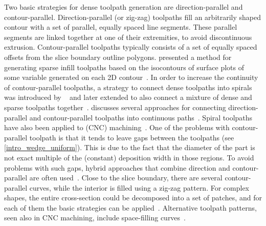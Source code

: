 Two basic strategies for dense toolpath generation are direction-parallel and contour-parallel.
Direction-parallel (or zig-zag) toolpaths fill an arbitrarily shaped contour with a set of parallel, equally spaced line segments.
These parallel segments are linked together at one of their extremities, to avoid discontinuous extrusion.
Contour-parallel toolpaths typically consists of a set of equally spaced offsets from the slice boundary outline polygons.
\citeauthor{steuben2016implicit} presented a method for generating sparse infill toolpaths based on the isocontours of surface plots of some variable generated on each 2D contour~\cite{steuben2016implicit}.
In order to increase the continuity of contour-parallel toolpaths, a strategy to connect dense toolpaths into spirals was introduced by \citeauthor{Zhao2016}~\cite{Zhao2016} and later extended to also connect a mixture of dense and sparse toolpaths together~\cite{KUIPERS2019CAD}.
\citeauthor{Jin2017RCIM} discusses several approaches for connecting direction-parallel and contour-parallel toolpaths into continuous paths~\cite{Jin2017RCIM}.
Spiral toolpaths have also been applied to (CNC) machining~\cite{Held2009,Huang2017}.
One of the problems with contour-parallel toolpath is that it tends to leave gaps between the toolpaths (see \cref{intro_wedge_uniform}).
This is due to the fact that the diameter of the part is not exact multiple of the (constant) deposition width in those regions.
To avoid problems with such gaps, hybrid approaches that combine direction and contour-parallel are often used~\cite{Mcmains2000DETC,Jin2013adaptive}.
Close to the slice boundary, there are several contour-parallel curves, while the interior is filled using a zig-zag pattern.
For complex shapes, the entire cross-section could be decomposed into a set of patches, and for each of them the basic strategies can be applied~\cite{Ding2014,Jin2017RCIM}.
Alternative toolpath patterns, seen also in CNC machining, include space-filling curves~\cite{Cox1994CAD,Griffiths1994,Shaikh2016}.

